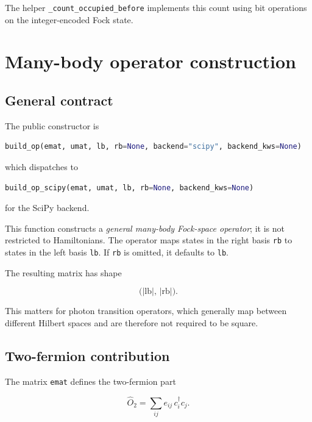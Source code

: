 \documentclass[11pt]{article}
\begin{document}
The helper \texttt{\_count\_occupied\_before} implements this count using bit operations on the integer-encoded Fock state.

\section{Many-body operator construction}

\subsection{General contract}

The public constructor is

\begin{lstlisting}[language=Python]
build_op(emat, umat, lb, rb=None, backend="scipy", backend_kws=None)
\end{lstlisting}

which dispatches to

\begin{lstlisting}[language=Python]
build_op_scipy(emat, umat, lb, rb=None, backend_kws=None)
\end{lstlisting}

for the SciPy backend.

This function constructs a \emph{general many-body Fock-space operator}; it is not restricted to Hamiltonians.  The operator maps states in the right basis \texttt{rb} to states in the left basis \texttt{lb}.  If \texttt{rb} is omitted, it defaults to \texttt{lb}.

The resulting matrix has shape

\begin{equation}
  \bigl(\lvert \mathrm{lb}\rvert,\,\lvert \mathrm{rb}\rvert\bigr).
\end{equation}

This matters for photon transition operators, which generally map between different Hilbert spaces and are therefore not required to be square.

\subsection{Two-fermion contribution}

The matrix \texttt{emat} defines the two-fermion part

\begin{equation}
  \hat O_2 = \sum_{ij} e_{ij}\, c_i^\dagger c_j.
\end{equation}
\end{document}
